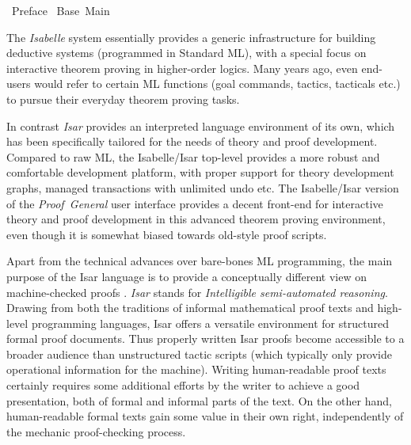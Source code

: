 %
\begin{isabellebody}%
\def\isabellecontext{Preface}%
%
\isadelimtheory
%
\endisadelimtheory
%
\isatagtheory
{}\isamarkupfalse%
\ Preface\isanewline
{}\ Base\ Main\isanewline
{}%
\endisatagtheory
{\isafoldtheory}%
%
\isadelimtheory
%
\endisadelimtheory
%
\isamarkuptrue%
%
\begin{isamarkuptext}%
The \emph{Isabelle} system essentially provides a generic
  infrastructure for building deductive systems (programmed in
  Standard ML), with a special focus on interactive theorem proving in
  higher-order logics.  Many years ago, even end-users would refer to
  certain ML functions (goal commands, tactics, tacticals etc.) to
  pursue their everyday theorem proving tasks.
  
  In contrast \emph{Isar} provides an interpreted language environment
  of its own, which has been specifically tailored for the needs of
  theory and proof development.  Compared to raw ML, the Isabelle/Isar
  top-level provides a more robust and comfortable development
  platform, with proper support for theory development graphs, managed
  transactions with unlimited undo etc.  The Isabelle/Isar version of
  the \emph{Proof~General} user interface
  \cite{proofgeneral,Aspinall:TACAS:2000} provides a decent front-end
  for interactive theory and proof development in this advanced
  theorem proving environment, even though it is somewhat biased
  towards old-style proof scripts.

  \medskip Apart from the technical advances over bare-bones ML
  programming, the main purpose of the Isar language is to provide a
  conceptually different view on machine-checked proofs
  \cite{Wenzel:1999:TPHOL,Wenzel-PhD}.  \emph{Isar} stands for
  \emph{Intelligible semi-automated reasoning}.  Drawing from both the
  traditions of informal mathematical proof texts and high-level
  programming languages, Isar offers a versatile environment for
  structured formal proof documents.  Thus properly written Isar
  proofs become accessible to a broader audience than unstructured
  tactic scripts (which typically only provide operational information
  for the machine).  Writing human-readable proof texts certainly
  requires some additional efforts by the writer to achieve a good
  presentation, both of formal and informal parts of the text.  On the
  other hand, human-readable formal texts gain some value in their own
  right, independently of the mechanic proof-checking process.


\end{isamarkuptext}
\end{isabellebody}
